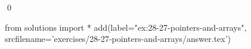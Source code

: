 
\begin{ex}
  \label{ex:28-27-pointers-and-arrays}
  
  \qed
\end{ex}
\begin{python0}
from solutions import *
add(label="ex:28-27-pointers-and-arrays",
    srcfilename='exercises/28-27-pointers-and-arrays/answer.tex')
\end{python0}

